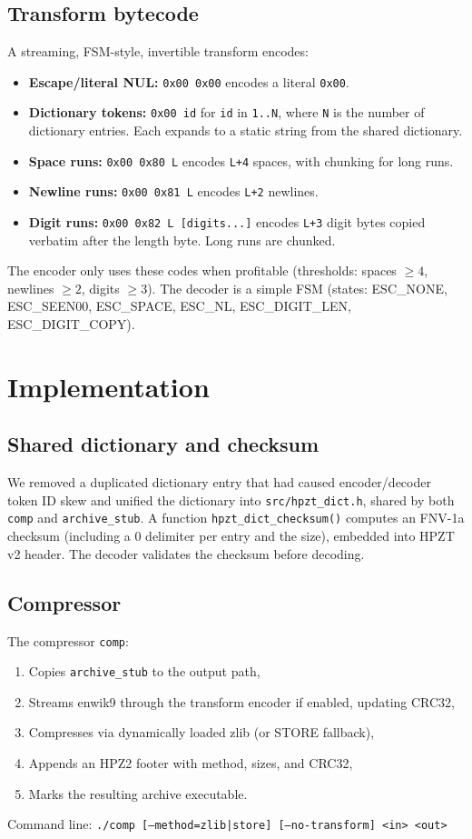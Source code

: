 \documentclass[11pt]{article}
\begin{document}
\subsection{Transform bytecode}
A streaming, FSM-style, invertible transform encodes:
\begin{itemize}[nosep]
  \item \textbf{Escape/literal NUL:} \texttt{0x00 0x00} encodes a literal \texttt{0x00}.
  \item \textbf{Dictionary tokens:} \texttt{0x00 id} for \texttt{id} in \texttt{1..N}, where \texttt{N} is the number of dictionary entries. Each expands to a static string from the shared dictionary.
  \item \textbf{Space runs:} \texttt{0x00 0x80 L} encodes \texttt{L+4} spaces, with chunking for long runs.
  \item \textbf{Newline runs:} \texttt{0x00 0x81 L} encodes \texttt{L+2} newlines.
  \item \textbf{Digit runs:} \texttt{0x00 0x82 L [digits...]} encodes \texttt{L+3} digit bytes copied verbatim after the length byte. Long runs are chunked.
\end{itemize}
The encoder only uses these codes when profitable (thresholds: spaces $\geq4$, newlines $\geq2$, digits $\geq3$). The decoder is a simple FSM (states: ESC\_NONE, ESC\_SEEN00, ESC\_SPACE, ESC\_NL, ESC\_DIGIT\_LEN, ESC\_DIGIT\_COPY).

\section{Implementation}
\subsection{Shared dictionary and checksum}
We removed a duplicated dictionary entry that had caused encoder/decoder token ID skew and unified the dictionary into \texttt{src/hpzt\_dict.h}, shared by both \texttt{comp} and \texttt{archive\_stub}. A function \texttt{hpzt\_dict\_checksum()} computes an FNV-1a checksum (including a 0 delimiter per entry and the size), embedded into HPZT v2 header. The decoder validates the checksum before decoding.

\subsection{Compressor}
The compressor \texttt{comp}:
\begin{enumerate}[nosep]
  \item Copies \texttt{archive\_stub} to the output path,
  \item Streams enwik9 through the transform encoder if enabled, updating CRC32,
  \item Compresses via dynamically loaded zlib (or STORE fallback),
  \item Appends an HPZ2 footer with method, sizes, and CRC32,
  \item Marks the resulting archive executable.
\end{enumerate}
Command line: \texttt{./comp [--method=zlib|store] [--no-transform] <in> <out>}
\end{document}
